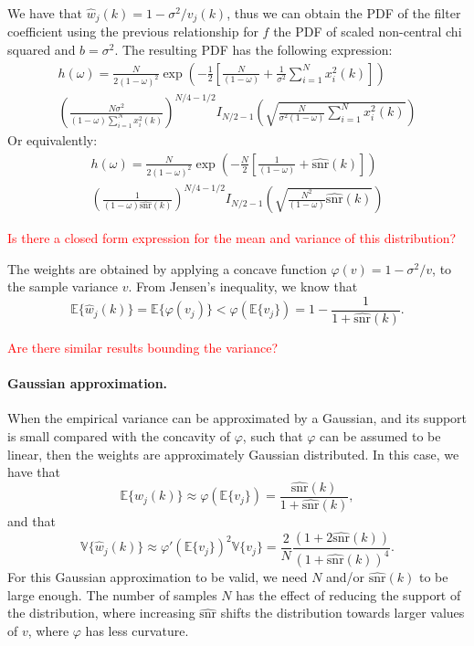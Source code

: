 \documentclass[a4paper,10pt]{article}
\begin{document}
We have that $\hat w_j(k) = 1 - \sigma^2/v_j(k)$, thus we can obtain the PDF of the 
filter coefficient using the previous relationship for $f$ the PDF of scaled non-central
chi squared and $b = \sigma^2$. The resulting PDF has the following expression:
\begin{multline*}
	h(\omega) = \frac{N}{2(1 - \omega)^2}
\exp\left(-\frac12\left[\frac{N}{(1-\omega)} + \frac1{\sigma^2}\sum_{i=1}^Nx_i^2(k)\right]\right)\\
\left(\frac{N\sigma^2}{(1-\omega)\sum_{i = 1}^N x_i^2(k)}\right)^{N/4-1/2}
I_{N/2-1}\left(\sqrt{\frac{N}{\sigma^2(1 - \omega)}\sum_{i =
1}^Nx_i^2(k)}\right)
\end{multline*}
Or equivalently:
\begin{multline*}
	h(\omega) = \frac{N}{2(1 - \omega)^2}
	\exp\left(-\frac{N}{2}\left[\frac{1}{(1-\omega)} + \hat{\text{snr}}(k)\right]\right)\\
	\left(\frac{1}{(1-\omega)\hat{\text{snr}}(k)}\right)^{N/4-1/2}
	I_{N/2-1}\left(\sqrt{\frac{N^2}{(1 - \omega)}\hat{\text{snr}}(k)}\right)
\end{multline*}

\noindent\textcolor{red}{Is there a closed form expression for the mean and variance of this distribution?}

The weights are obtained by applying a concave function $\varphi(v) = 1 -
\sigma^2/v$, to the sample variance $v$. From Jensen's inequality, we know that
\[\mathbb E\{\hat w_j(k)\} = \mathbb E\{\varphi(v_j)\} < \varphi(\mathbb
E\{v_j\}) = 1 - \frac{1}{1 + \hat{\text{snr}}(k)}.\]

\noindent\textcolor{red}{Are there similar results bounding the variance?}

\paragraph{Gaussian approximation.}When the empirical variance can be approximated by a Gaussian, 
and its support is small compared with the concavity of $\varphi$, such that $\varphi$ can be 
assumed to be linear, then the weights are approximately Gaussian distributed. In this case,
we have that
\[\mathbb E\{\hat w_j(k)\}\approx \varphi(\mathbb E\{v_j\}) =\frac{\hat{\text{snr}}(k)}{1 + \hat{\text{snr}}(k)},\]
and that
\[\mathbb V\{\hat w_j(k)\}\approx \varphi'(\mathbb E\{v_j\})^2 \mathbb V\{v_j\}=
\frac{2}N\frac{\left(1 + 2\hat{\text{snr}}(k)\right)}{(1 + \hat{\text{snr}}(k))^4}.\]
For this Gaussian approximation to be valid, we need $N$ and/or
$\hat{\text{snr}}(k)$ to be large enough. The number of samples $N$ has the effect of 
reducing the support of the distribution, where increasing $\hat{\text{snr}}$ shifts the
distribution towards larger values of $v$, where $\varphi$ has less curvature.
\end{document}
